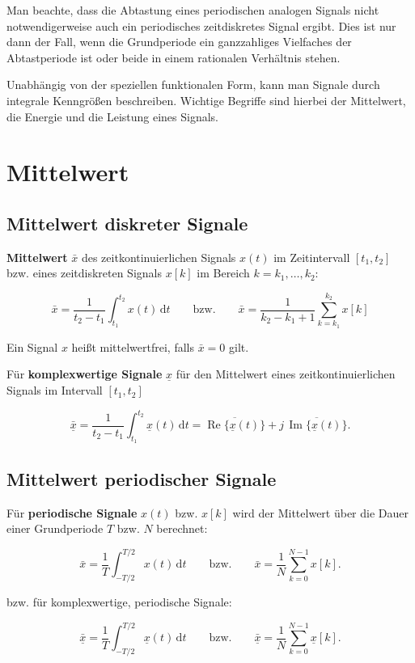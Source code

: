Man beachte, dass die Abtastung eines periodischen analogen Signals nicht notwendigerweise auch ein periodisches zeitdiskretes Signal ergibt. Dies ist nur dann der Fall, wenn die Grundperiode ein ganzzahliges Vielfaches der Abtastperiode ist oder beide in einem rationalen Verhältnis stehen.

Unabhängig von der speziellen funktionalen Form, kann man Signale durch integrale Kenngrößen beschreiben. Wichtige Begriffe sind hierbei der Mittelwert, die Energie und die Leistung eines Signals.


\section{Mittelwert}
\label{sec:mittelwert}

\subsection{Mittelwert diskreter Signale}
\label{sec:mittelwert-diskret}

\begin{definition}[Mittelwert]
\textbf{Mittelwert} $\bar{x}$ des zeitkontinuierlichen Signals $x(t)$ im Zeitintervall $[t_1, t_2]$
bzw. eines zeitdiskreten Signals $x[k]$ im Bereich $k = k_1, \ldots, k_2$:

$$
\bar{x} = \frac{1}{t_2 - t_1} \int_{t_1}^{t_2} x(t)\,\mathrm{d}t
\qquad \text{bzw.} \qquad
\bar{x} = \frac{1}{k_2 - k_1 + 1} \sum_{k=k_1}^{k_2} x[k]
$$

Ein Signal $x$ heißt mittelwertfrei, falls $\bar{x} = 0$ gilt.


Für \textbf{komplexwertige Signale} $\underline{x}$ für den Mittelwert eines zeitkontinuierlichen
Signals im Intervall $[t_1, t_2]$

$$
\bar{\underline{x}} = \frac{1}{t_2 - t_1} \int_{t_1}^{t_2} \underline{x}(t)\,\mathrm{d}t
= \overline{\operatorname{Re}\{\underline{x}(t)\}} + j\,\overline{\operatorname{Im}\{\underline{x}(t)\}}.
$$
\end{definition}

\subsection{Mittelwert periodischer Signale}
\label{sec:mittelwert-periodisch}

\begin{definition}
Für \textbf{periodische Signale} $x(t)$ bzw. $x[k]$ wird der Mittelwert über die
Dauer einer Grundperiode $T$ bzw. $N$ berechnet:

$$
\bar{x} = \frac{1}{T} \int_{-T/2}^{T/2} x(t)\,\mathrm{d}t
\qquad \text{bzw.} \qquad
\bar{x} = \frac{1}{N} \sum_{k=0}^{N-1} x[k].
$$

bzw. für komplexwertige, periodische Signale:

$$
\bar{\underline{x}} = \frac{1}{T} \int_{-T/2}^{T/2} \underline{x}(t)\,\mathrm{d}t
\qquad \text{bzw.} \qquad
\bar{\underline{x}} = \frac{1}{N} \sum_{k=0}^{N-1} \underline{x}[k].
$$
\end{definition}

